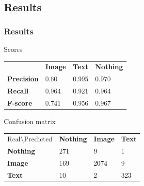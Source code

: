 \subsection{Results}
\begin{frame}
\frametitle{Results}

\begin{block}{Scores}
\begin{tabular}{l l l l}
  & \textbf{Image} & \textbf{Text} & \textbf{Nothing} \\
\textbf{Precision} & 0.60  & 0.995 & 0.970 \\
\textbf{Recall} & 0.964  & 0.921 & 0.964 \\
\textbf{F-score} & 0.741 & 0.956 & 0.967
\end{tabular}
\end{block}

\begin{block}{Confusion matrix}
\begin{tabular}{l l l l}
Real\textbackslash Predicted & \textbf{Nothing} & \textbf{Image} & \textbf{Text} \\
\textbf{Nothing} & 271 & 9 & 1 \\
\textbf{Image} & 169 & 2074 & 9 \\
\textbf{Text} & 10 & 2 & 323
\end{tabular}
\end{block}



%


\end{frame}
